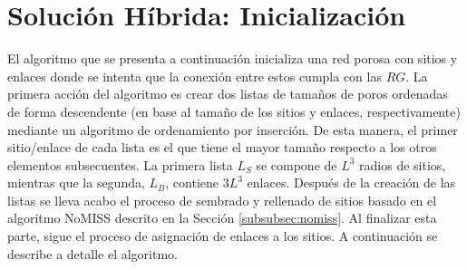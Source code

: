   
\section{Solución Híbrida: Inicializaci\'on}
\label{sec:hybrid}
El algoritmo que se presenta a continuación \cite{ref17} inicializa una red porosa con sitios y enlaces donde se intenta que 
la conexi\'on entre estos cumpla con las $RG$. La primera acción del algoritmo es crear dos listas de tamaños de poros ordenadas 
de forma descendente (en base al tamaño de los sitios y enlaces, respectivamente) mediante un algoritmo de ordenamiento por inserción. 
De esta manera, el primer sitio/enlace de cada lista es el que tiene el mayor tamaño respecto a los otros elementos subsecuentes.
La primera lista $L_S$ se compone de $L^3$ radios de sitios, mientras que la segunda, $L_B$, contiene $3L^3$ enlaces. Despu\'es de 
la creaci\'on de  las listas se lleva acabo el proceso de sembrado y rellenado de sitios basado en el algoritmo NoMISS descrito 
en la Sección \ref{subsubsec:nomiss}. Al finalizar esta parte, sigue el proceso de asignación de enlaces a los sitios. 
A continuación se describe a detalle el algoritmo.



